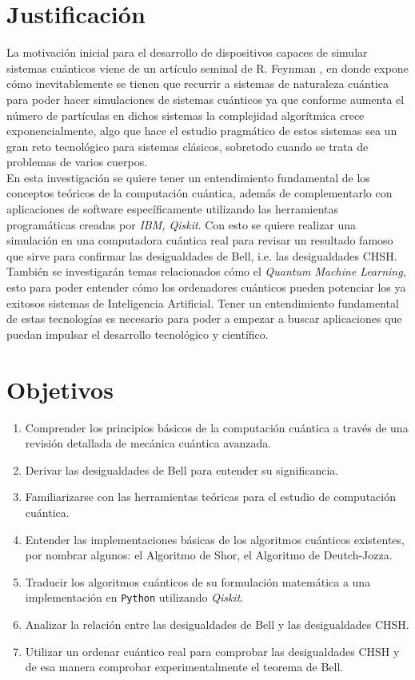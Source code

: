 \documentclass[a4paper]{article}
\begin{document}
\section{Justificación}
La motivación inicial para el desarrollo de dispositivos capaces de simular sistemas cuánticos viene de un artículo seminal de R. Feynman \cite{Feynman}, en donde expone cómo inevitablemente se tienen que recurrir a sistemas de naturaleza cuántica para poder hacer simulaciones de sistemas cuánticos ya que conforme aumenta el número de partículas en dichos sistemas la complejidad algorítmica crece exponencialmente, algo que hace el estudio pragmático de estos sistemas sea un gran reto tecnológico para sistemas clásicos, sobretodo cuando se trata de problemas de varios cuerpos.\\

En esta investigación se quiere tener un entendimiento fundamental de los conceptos teóricos de la computación cuántica, además de complementarlo con aplicaciones de software específicamente utilizando las herramientas programáticas creadas por \textit{IBM, Qiskit}. Con esto se quiere realizar una simulación en una computadora cuántica real para revisar un resultado famoso que sirve para confirmar las desigualdades de Bell, i.e. las desigualdades CHSH.\\

También se investigarán temas relacionados cómo el \textit{Quantum Machine Learning}, esto para poder entender cómo los ordenadores cuánticos pueden potenciar los ya exitosos sistemas de Inteligencia Artificial. Tener un entendimiento fundamental de estas tecnologías es necesario para poder a empezar a buscar aplicaciones que puedan impulsar el desarrollo tecnológico y científico.
\section{Objetivos}
\begin{enumerate}
\item Comprender los principios básicos de la computación cuántica a través de una revisión detallada de mecánica cuántica avanzada.
\item Derivar las desigualdades de Bell para entender su significancia.
\item Familiarizarse con las herramientas teóricas para el estudio de computación cuántica.
\item Entender las implementaciones básicas de los algoritmos cuánticos existentes, por nombrar algunos: el Algoritmo de Shor, el Algoritmo de Deutch-Jozza.
\item Traducir los algoritmos cuánticos de su formulación matemática a una implementación en \texttt{Python} utilizando \textit{Qiskit}.
\item Analizar la relación entre las desigualdades de Bell y las desigualdades CHSH.
\item Utilizar un ordenar cuántico real para comprobar las desigualdades CHSH y de esa manera comprobar experimentalmente el teorema de Bell.

\end{enumerate}
\end{document}
